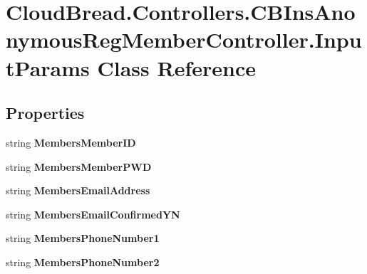 \hypertarget{a00115}{}\section{Cloud\+Bread.\+Controllers.\+C\+B\+Ins\+Anonymous\+Reg\+Member\+Controller.\+Input\+Params Class Reference}
\label{a00115}
\subsection*{Properties}
\begin{DoxyCompactItemize}
\item 
string {\bfseries Members\+Member\+ID}\hypertarget{a00115_a04834d2e015fd4ca4068aeb4f6982a45}{}\label{a00115_a04834d2e015fd4ca4068aeb4f6982a45}

\item 
string {\bfseries Members\+Member\+P\+WD}\hypertarget{a00115_aff709c37b5e5c860af0714b7d12eb1f2}{}\label{a00115_aff709c37b5e5c860af0714b7d12eb1f2}

\item 
string {\bfseries Members\+Email\+Address}\hypertarget{a00115_aa9ee41b5c0696956fefcfdeb16387318}{}\label{a00115_aa9ee41b5c0696956fefcfdeb16387318}

\item 
string {\bfseries Members\+Email\+Confirmed\+YN}\hypertarget{a00115_a0a4076f7971c72b3b002f2b4d29306c9}{}\label{a00115_a0a4076f7971c72b3b002f2b4d29306c9}

\item 
string {\bfseries Members\+Phone\+Number1}\hypertarget{a00115_a47a38f3c63f4f307f5afa4610fdcd2e1}{}\label{a00115_a47a38f3c63f4f307f5afa4610fdcd2e1}

\item 
string {\bfseries Members\+Phone\+Number2}\hypertarget{a00115_a3e0ee5d331efeef5a83f79bb481a3442}{}\label{a00115_a3e0ee5d331efeef5a83f79bb481a3442}


\end{DoxyCompactItemize}
